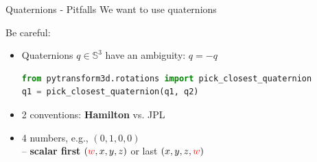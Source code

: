 \documentclass[14pt]{beamer}
\begin{document}
\begin{frame}[fragile]{Quaternions - Pitfalls}
We want to use quaternions \parencite{Ude2014}

\vskip 1cm
\pause

Be careful:
\begin{itemize}
\item Quaternions $q \in \mathbb{S}^3$ have an ambiguity: $q = -q$
\begin{lstlisting}[language=Python]
from pytransform3d.rotations import pick_closest_quaternion
q1 = pick_closest_quaternion(q1, q2)
\end{lstlisting}
\item 2 conventions: \textbf{Hamilton} vs. JPL\\\parencite{Sommer2018}
\item 4 numbers, e.g., $(0, 1, 0, 0)$\\
-- \textbf{scalar first} $(\textcolor{red}{w}, x, y, z)$ or last
$(x, y, z, \textcolor{red}{w})$
\end{itemize}
\end{frame}
\end{document}
